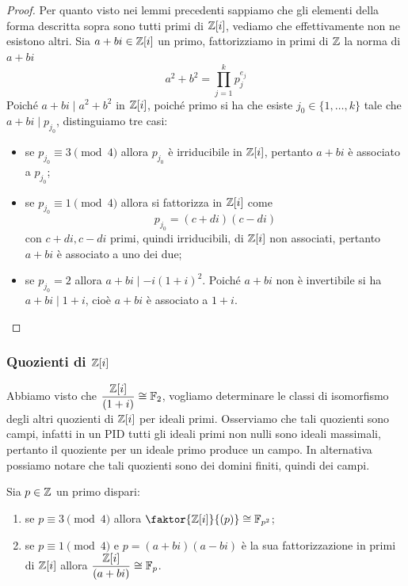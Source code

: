 \documentclass[11pt]{scrartcl}
\begin{document}
	\begin{proof}
		Per quanto visto nei lemmi precedenti sappiamo che gli elementi della forma
		descritta sopra sono tutti primi di $\mathbb Z[i]$, vediamo che effettivamente
		non ne esistono altri.\newline
		Sia $a + bi \in \mathbb Z[i]$ un primo, fattorizziamo in primi di $\mathbb Z$ la norma 
		di $a + bi$
		\[
		a^2 + b^2 = \prod_{j = 1}^k p_j^{e_j}
		\]
		Poiché $a + bi \mid a^2 + b^2$ in $\mathbb Z[i]$, poiché primo si ha che esiste 
		$j_0 \in \{1, \ldots, k\}$ tale che $a + bi \mid p_{j_0}$, distinguiamo tre casi:
		\begin{itemize}
			\item se $p_{j_0}\equiv 3 \pmod 4$ allora $p_{j_0}$ è irriducibile in 
			$\mathbb Z[i]$, pertanto $a + bi$ è associato a $p_{j_0}$;
			\item se $p_{j_0} \equiv 1 \pmod 4$ allora si fattorizza in $\mathbb Z[i]$ come 
			\[
			p_{j_0} = (c + di)(c - di)
			\]
			con $c + di, c - di$ primi, quindi irriducibili, di $\mathbb Z[i]$ non 
			associati, pertanto $a + bi$ è associato a uno dei due;
			\item se $p_{j_0} = 2$ allora $a + bi \mid -i(1 + i)^2$. Poiché $a + bi$
			non è invertibile si ha $a + bi \mid 1 + i$, cioè $a + bi$ è 
			associato a $1 + i$.
		\end{itemize}
	\end{proof}
	
	
	\subsubsection{Quozienti di {\texorpdfstring{$\mathbb Z[i]$}{ℤ[i]}}}
	
	Abbiamo visto che $\displaystyle\frac{\mathbb Z[i]}{(1 + i)} \cong \mathbb F_2$, vogliamo
	determinare le classi di isomorfismo degli altri quozienti di $\mathbb Z[i]$ per 
	ideali primi. Osserviamo che tali quozienti sono campi, infatti in un PID tutti 
	gli ideali primi non nulli sono ideali massimali, pertanto il quoziente per 
	un ideale primo produce un campo. In alternativa possiamo notare che tali
	quozienti sono dei domini finiti, quindi dei campi.
	
	\begin{proposition}
		Sia $p \in \mathbb Z$ un primo dispari:
		\begin{enumerate}[(1)]
			\item se $p \equiv 3 \pmod 4$ allora $\faktor{\ZZ[i]}{(p)}
			\cong \FF_{p^2}$;
			\item se $p \equiv 1 \pmod 4$ e $p = (a + bi)(a - bi)$ è la sua 
			fattorizzazione in primi di $\mathbb Z[i]$ allora $\displaystyle\frac{\mathbb Z[i]}{(a + bi)}
			\cong \mathbb F_p$.
		\end{enumerate}
	\end{proposition}
	
\end{document}
